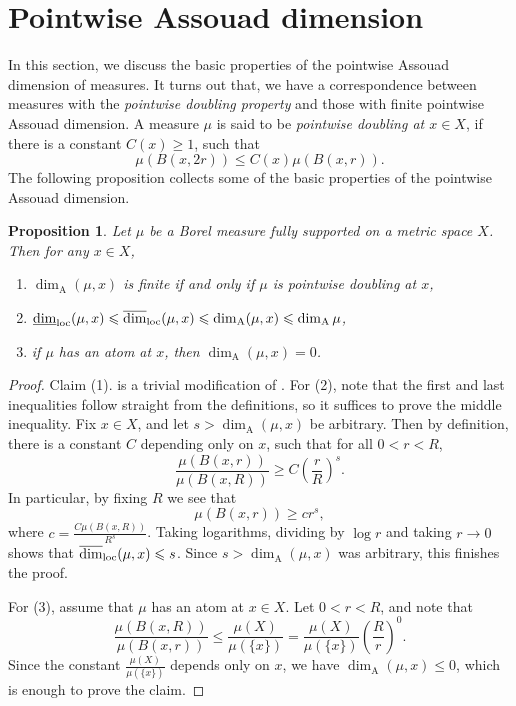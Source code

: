 \documentclass{PRM}
\newcommand{\updim}{\overline{\dim}}
\newcommand{\lowdim}{\underline{\dim}}
\newcommand{\adim}{\dim_{\mathrm{A}}}
\theoremstyle{plain}
\newtheorem{prop}[thm]{Proposition}
\theoremstyle{definition}
\theoremstyle{remark}
\begin{document}
\section{Pointwise Assouad dimension}\label{sec:pw_assouad}
In this section, we discuss the basic properties of the pointwise Assouad dimension of measures. It turns out that, we have a correspondence between measures with the \emph{pointwise doubling property} and those with finite pointwise Assouad dimension. A measure $\mu$ is said to be \emph{pointwise doubling at $x\in X$}, if there is a constant $C(x)\geq 1$, such that
\begin{equation*}
    \mu(B(x,2r))\leq C(x)\mu(B(x,r)).
\end{equation*}
The following proposition collects some of the basic properties of the pointwise Assouad dimension.
\begin{prop}\label{prop:basic_properties}
Let $\mu$ be a Borel measure fully supported on a metric space $X$. Then for any $x\in X$,
\begin{enumerate}
    \item[(1)] $\dim_{\mathrm{A}}(\mu,x)$ is finite if and only if $\mu$ is pointwise doubling at $x$,
    \item[(2)] $\lowdim_{\textnormal{loc}}(\mu,x)\leq\updim_{\textnormal{loc}}(\mu,x)\leq \dim_{\mathrm{A}}(\mu,x)\leq \adim\mu$,
    \item[(3)] if $\mu$ has an atom at $x$, then $\dim_{\mathrm{A}}(\mu,x)=0$.
\end{enumerate}
\end{prop}
\begin{proof}
    Claim (1). is a trivial modification of \cite[Lemma 4.1.1]{F}. For (2), note that the first and last inequalities follow straight from the definitions, so it suffices to prove the middle inequality. Fix $x\in X$, and let $s> \dim_{\mathrm{A}}(\mu,x)$ be arbitrary. Then by definition, there is a constant $C$ depending only on $x$, such that for all $0<r<R$,
    \begin{equation*}
        \frac{\mu(B(x,r))}{\mu(B(x,R))}\geq C\left(\frac{r}{R}\right)^s.
    \end{equation*}
    In particular, by fixing $R$ we see that
    \begin{equation*}
        \mu(B(x,r))\geq c r^s,
    \end{equation*}
    where $c=\frac{C\mu(B(x,R))}{R^s}$. Taking logarithms, dividing by $\log r$ and taking $r\to 0$ shows that $\updim_{\textnormal{loc}}(\mu,x)\leq s$. Since $s>\dim_{\mathrm{A}}(\mu,x)$ was arbitrary, this finishes the proof.

    For (3), assume that $\mu$ has an atom at $x\in X$. Let $0<r<R$, and note that
    \begin{equation*}
        \frac{\mu(B(x,R))}{\mu(B(x,r))}\leq \frac{\mu(X)}{\mu(\{x\})}=\frac{\mu(X)}{\mu(\{x\})}\left(\frac{R}{r}\right)^0.
    \end{equation*}
    Since the constant $\frac{\mu(X)}{\mu(\{x\})}$ depends only on $x$, we have $\dim_{\mathrm{A}}(\mu,x)\leq 0$, which is enough to prove the claim.
\end{proof}
\end{document}
